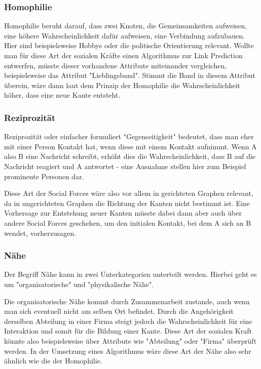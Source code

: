 \subsubsection{Homophilie}
Homophilie beruht darauf, dass zwei Knoten, die Gemeinsamkeiten aufweisen, eine höhere Wahrscheinlichkeit dafür
aufweisen, eine Verbindung aufzubauen. Hier sind beispielsweise Hobbys oder die politische Orientierung relevant. Wollte
man für diese Art der sozialen Kräfte einen Algorithmus zur Link Prediction entwerfen, müsste dieser vorhandene
Attribute miteinander vergleichen, beispielsweise das Attribut "Lieblingsband". Stimmt die Band in diesem Attribut
überein, wäre dann laut dem Prinzip der Homophilie die Wahrscheinlichkeit höher, dass eine neue Kante entsteht.

\subsubsection{Reziprozität}
Reziprozität oder einfacher formuliert "Gegenseitigkeit" bedeutet, dass man eher mit einer Person Kontakt hat, wenn
diese mit einem Kontakt aufnimmt. Wenn A also B eine Nachricht schreibt, erhöht dies die Wahrscheinlichkeit, dass B auf
die Nachricht reagiert und A antwortet - eine Ausnahme stellen hier zum Beispiel prominente Personen dar.

Diese Art der Social Forces wäre also vor allem in gerichteten Graphen relevant, da in ungerichteten Graphen die
Richtung der Kanten nicht bestimmt ist. Eine Vorhersage zur Entstehung neuer Kanten müsste dabei dann aber auch über
andere Social Forces geschehen, um den initialen Kontakt, bei dem A sich an B wendet, vorherzusagen.

\subsubsection{Nähe}
Der Begriff Nähe kann in zwei Unterkategorien unterteilt werden. Hierbei geht es um "organisatorische" und
"physikalische Nähe".

Die organisatorische Nähe kommt durch Zusammenarbeit zustande, auch wenn man sich eventuell nicht
am selben Ort befindet. Durch die Angehörigkeit derselben Abteilung in einer Firma steigt jedoch die Wahrscheinlichkeit
für eine Interaktion und somit für die Bildung einer Kante. Diese Art der sozialen Kraft könnte also beispielsweise
über Attribute wie "Abteilung" oder "Firma" überprüft werden. In der Umsetzung eines Algorithmus wäre diese Art der
Nähe also sehr ähnlich wie die der Homophilie.

